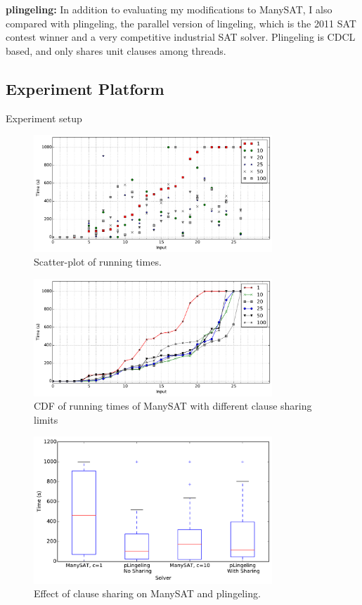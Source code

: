 \documentclass{article}
\begin{document}
\textbf{plingeling:} In addition to evaluating my modifications to
ManySAT, I also compared with plingeling, the parallel version of
lingeling, which is the 2011 SAT contest winner and a very competitive
industrial SAT solver. Plingeling is CDCL based, and only shares unit
clauses among threads.



\subsection{Experiment Platform}
Experiment setup

\begin{figure}[h]
  \centering
  \includegraphics[width=0.8\textwidth]{../figs/scatter_all.pdf}
  \caption{Scatter-plot of running times.}
  \label{fig:scatter-1}
\end{figure}


\begin{figure}[h]
  \centering
  \includegraphics[width=0.8\textwidth]{../figs/scatter_cdf.pdf}
  \caption{CDF of running times of ManySAT with different clause sharing limits}
  \label{fig:scatter-2}
\end{figure}


\begin{figure}[h]
  \centering
  \includegraphics[width=0.8\textwidth]{../figs/cmp_box.pdf}
  \caption{Effect of clause sharing on ManySAT and plingeling.}
  \label{fig:cmp-1}
\end{figure}
\end{document}
